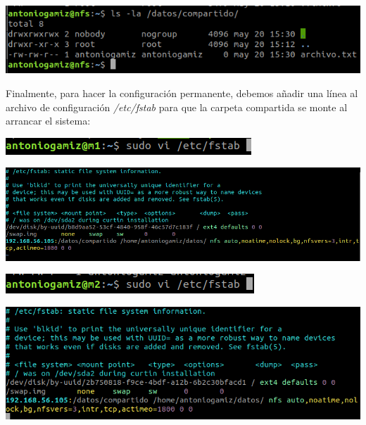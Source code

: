 \documentclass[12pt]{article}
\begin{document}
\centerline{\includegraphics[scale=0.6]{19.png}}


Finalmente, para hacer la configuración permanente, debemos añadir una línea al archivo de configuración \textit{/etc/fstab} para que la carpeta compartida se monte al arrancar el sistema:\\


\centerline{\includegraphics[scale=0.6]{20.png}}

\centerline{\includegraphics[scale=0.5]{21.png}}

\medskip

\centerline{\includegraphics[scale=0.6]{22.png}}

\centerline{\includegraphics[scale=0.5]{23.png}}
\end{document}
